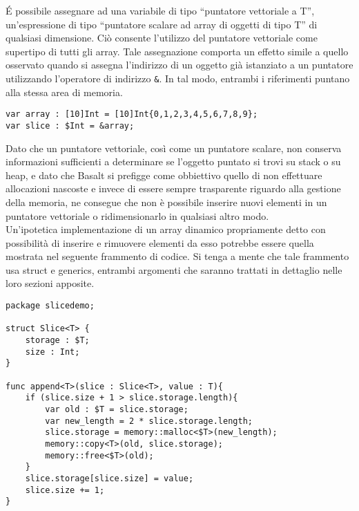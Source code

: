 É possibile assegnare ad una variabile di tipo “puntatore vettoriale a T”, un’espressione di tipo “puntatore scalare ad array di oggetti di tipo T” 
di qualsiasi dimensione. Ciò consente l'utilizzo del puntatore vettoriale come supertipo di tutti gli array. Tale assegnazione 
comporta un effetto simile a quello osservato quando si assegna l'indirizzo di un oggetto già istanziato a un puntatore utilizzando 
l'operatore di indirizzo \texttt{\&}. In tal modo, entrambi i riferimenti puntano alla stessa area di memoria. \\

\vspace{0.5cm}
\begin{lstlisting}[frame=single]
var array : [10]Int = [10]Int{0,1,2,3,4,5,6,7,8,9};
var slice : $Int = &array;
\end{lstlisting}
\vspace{0.5cm}

Dato che un puntatore vettoriale, così come un puntatore scalare, non conserva informazioni sufficienti a determinare se 
l’oggetto puntato si trovi su stack o su heap, e dato che Basalt si prefigge come obbiettivo quello di non 
effettuare allocazioni nascoste e invece di essere sempre trasparente riguardo alla gestione della memoria, ne consegue che non 
è possibile inserire nuovi elementi in un puntatore vettoriale o ridimensionarlo in qualsiasi altro modo. \\

Un’ipotetica implementazione di un array dinamico propriamente detto con possibilità di 
inserire e rimuovere elementi da esso potrebbe essere quella mostrata nel seguente frammento di codice. 
Si tenga a mente che tale frammento usa struct e generics, entrambi argomenti che saranno trattati in 
dettaglio nelle loro sezioni apposite. \\


\vspace{0.5cm}
\begin{lstlisting}[frame=single]
package slicedemo;

struct Slice<T> {
    storage : $T;
    size : Int;
}

func append<T>(slice : Slice<T>, value : T){
    if (slice.size + 1 > slice.storage.length){
        var old : $T = slice.storage; 
        var new_length = 2 * slice.storage.length;
        slice.storage = memory::malloc<$T>(new_length);
        memory::copy<T>(old, slice.storage);
        memory::free<$T>(old);
    }
    slice.storage[slice.size] = value;
    slice.size += 1;
}
\end{lstlisting}
\vspace{0.5cm}